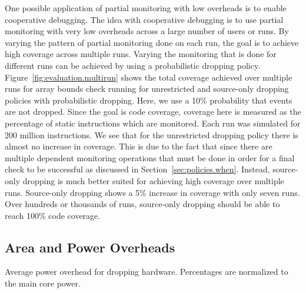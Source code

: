 One possible application of partial monitoring with low overheads is to enable
cooperative debugging. 
The idea with cooperative debugging is to use partial
monitoring with very low overheads across a large number of users or runs. By
varying the pattern of partial monitoring done on each run, the goal is to
achieve high coverage across multiple runs. Varying the monitoring that is
done for different runs can be achieved by using a probabilistic dropping policy.
Figure~\ref{fig:evaluation.multirun} shows the total
coverage achieved over multiple runs for array bounds check running for
unrestricted and source-only dropping policies with probabilistic dropping. Here, we use a 10\% probability
that events are not dropped. Since the goal is code coverage, coverage here is
measured as the percentage of static instructions which are monitored. Each run
was simulated for 200 million instructions. 
We see that for the unrestricted dropping policy there is almost no increase in
coverage.  This is due to the fact that since there are multiple dependent
monitoring operations that must be done in order for a final check to be
successful as discussed in Section~\ref{sec:policies.when}.
Instead, source-only
dropping is much better suited for achieving high coverage over multiple runs.
Source-only dropping shows a 5\% increase in coverage with only seven runs.
Over hundreds or thousands of runs, source-only dropping should be able to
reach 100\% code coverage.

\subsection{Area and Power Overheads}

\begin{table}[tb]
  \begin{center}
    \vspace{-0.0in}
    \begin{footnotesize}
    
    \end{footnotesize}
    \caption{Average power overhead for dropping hardware. Percentages 
    are normalized to the main core power.}
    \vspace{-0.2in}
    \label{tab:evaluation.area_power}
  \end{center}
\end{table}

